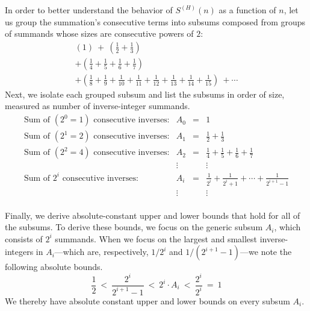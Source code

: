 In order to better understand the behavior of $S^{(H)}(n)$ as a
function of $n$, let us group the summation's consecutive terms into
subsums composed from groups of summands whose sizes are consecutive
powers of $2$:
\begin{eqnarray*}
\left( 1 \right) \ + \ \left( \frac{1}{2} + \frac{1}{3} \right)\\
+ \left( \frac{1}{4} + \frac{1}{5} + \frac{1}{6} + \frac{1}{7} \right) \\
+ \left( \frac{1}{8} +\frac{1}{9} + \frac{1}{10} + \frac{1}{11}
       + \frac{1}{12} + \frac{1}{13} + \frac{1}{14} + \frac{1}{15} \right) \ + \cdots
\end{eqnarray*}
Next, we isolate each grouped subsum and list the subsums in order of
size, measured as number of inverse-integer summands.
\[ \begin{array}{llcl}
\mbox{Sum of $(2^0 =1)$ consecutive inverses:} &
A_0 & = &  {\displaystyle 1 } \\
\mbox{Sum of $(2^1 =2)$ consecutive inverses:} &
A_1 & = &  {\displaystyle \frac{1}{2} + \frac{1}{3} }  \\
\mbox{Sum of $(2^2 =4)$ consecutive inverses:} &
A_2 & = &  {\displaystyle \frac{1}{4} + \frac{1}{5} + \frac{1}{6} + \frac{1}{7} } \\
 & \vdots & & \vdots \\
\mbox{Sum of $2^i$ consecutive inverses:} &
A_i & = &  {\displaystyle \frac{1}{2^i} + \frac{1}{2^i+1} + \cdots +
     \frac{1}{2^{i+1}-1}  } \\
 & \vdots & & \vdots \\
\end{array}
\]

Finally, we derive absolute-constant upper and lower bounds that hold
for all of the subsums.  To derive these bounds, we focus on the
generic subsum $A_i$, which consists of $2^i$ summands.  When we focus
on the largest and smallest inverse-integers in $A_i$---which are,
respectively, $1/2^i$ and $1/(2^{i+1}-1)$---we note the following
absolute bounds.
\[
\frac{1}{2}
 \ < \
\frac{2^i}{2^{i+1}-1}
 \ < \
2^i \cdot A_i
  \ < \
\frac{2^i}{2^i}
  \ = \ 1
\]
We thereby have absolute constant upper and lower bounds on every 
subsum $A_i$.

